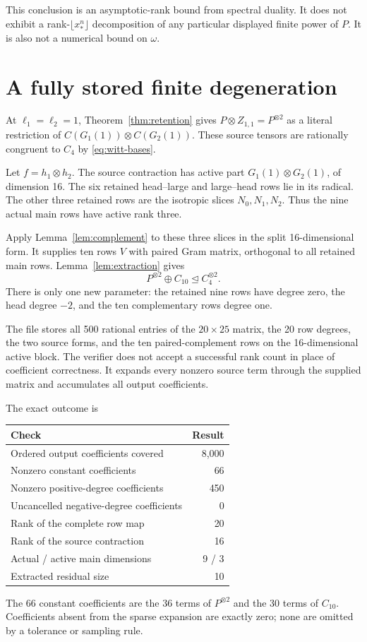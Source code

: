 \documentclass[11pt]{article}
\theoremstyle{definition}\newtheorem{definition}[theorem]{Definition}
\theoremstyle{remark}\newtheorem{remark}[theorem]{Remark}
\newcommand{\file}[1]{\texttt{\detokenize{#1}}}
\begin{document}
This conclusion is an asymptotic-rank bound from spectral duality. It does not exhibit a rank-$\lfloor x_*^{n}\rfloor$ decomposition of any particular displayed finite power of $P$. It is also not a numerical bound on $\omega$.

\section{A fully stored finite degeneration}\label{sec:small}

At $\ell_1=\ell_2=1$, Theorem~\ref{thm:retention} gives $P\otimes Z_{1,1}=P^{\otimes2}$ as a literal restriction of $C(G_1(1))\otimes C(G_2(1))$. These source tensors are rationally congruent to $C_4$ by \eqref{eq:witt-bases}.

Let $f=h_1\otimes h_2$. The source contraction has active part $G_1(1)\otimes G_2(1)$, of dimension 16. The six retained head--large and large--head rows lie in its radical. The other three retained rows are the isotropic slices $N_0,N_1,N_2$. Thus the nine actual main rows have active rank three.

Apply Lemma~\ref{lem:complement} to these three slices in the split 16-dimensional form. It supplies ten rows $V$ with paired Gram matrix, orthogonal to all retained main rows. Lemma~\ref{lem:extraction} gives
\[
 P^{\otimes2}\oplus C_{10}\unlhd C_4^{\otimes2}.
\]
There is only one new parameter: the retained nine rows have degree zero, the head degree $-2$, and the ten complementary rows degree one.

The file \file{certificates/small_degeneration.json} stores all 500 rational entries of the $20\times25$ matrix, the 20 row degrees, the two source forms, and the ten paired-complement rows on the 16-dimensional active block. The verifier does not accept a successful rank count in place of coefficient correctness. It expands every nonzero source term through the supplied matrix and accumulates all output coefficients.

The exact outcome is
\begin{center}
\begin{tabular}{l r}
\toprule
Check & Result\\\midrule
Ordered output coefficients covered &8,000\\
Nonzero constant coefficients &66\\
Nonzero positive-degree coefficients &450\\
Uncancelled negative-degree coefficients &0\\
Rank of the complete row map &20\\
Rank of the source contraction &16\\
Actual / active main dimensions &9 / 3\\
Extracted residual size &10\\\bottomrule
\end{tabular}
\end{center}
The 66 constant coefficients are the 36 terms of $P^{\otimes2}$ and the 30 terms of $C_{10}$. Coefficients absent from the sparse expansion are exactly zero; none are omitted by a tolerance or sampling rule.
\end{document}
